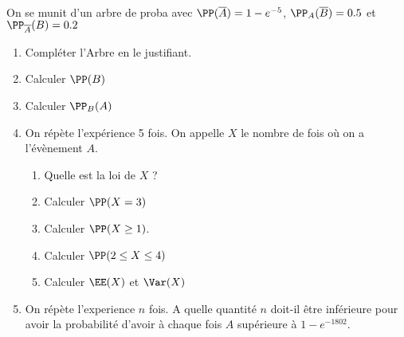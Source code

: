 \documentclass[12pt,fleqn]{report} %
\begin{document}
\begin{exercise}\label{Exercice 56}\text{ }\\
		On se munit d'un arbre de proba avec $\PP(\overline{A})= 1 - e^{-5}$, $\PP_{A}(\overline{B}) = 0.5$ et $\PP_{\overline{A}}(B) = 0.2$
	\begin{enumerate}
		\item Compléter l'Arbre en le justifiant.
		\item Calculer $\PP(B)$
		\item Calculer $\PP_B(A)$
		\item On répète l'expérience 5 fois. On appelle $X$ le nombre de fois où on a l'évènement $A$.
		\begin{enumerate}
			\item Quelle est la loi de $X$ ? 
			\item Calculer $\PP(X = 3)$
			\item Calculer $\PP(X \geq 1)$.
			\item Calculer $\PP(2 \leq X \leq 4)$
			\item Calculer $\EE(X)$ et $\Var(X)$
		\end{enumerate}
		\item On répète l'experience $n$ fois. A quelle quantité $n$ doit-il être inférieure pour avoir la probabilité d'avoir à chaque fois $A$ supérieure à $1 - e^{-1802}$.
	\end{enumerate}
\end{exercise}
\end{document}
